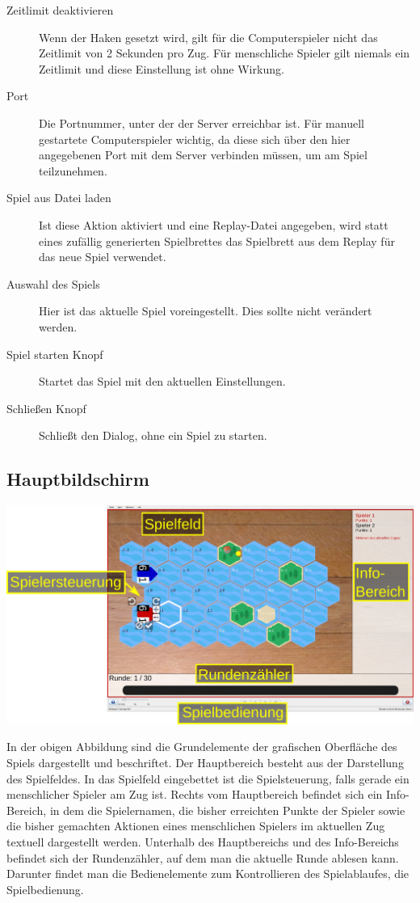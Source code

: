 \documentclass[12pt,a4paper, ngerman, oneside]{scrartcl}
\begin{document}
\begin{description}
\item [Zeitlimit deaktivieren] Wenn der Haken gesetzt wird, gilt für die Computerspieler nicht das Zeitlimit von 2 Sekunden pro Zug. Für menschliche Spieler gilt niemals ein Zeitlimit und diese Einstellung ist ohne Wirkung.
\item [Port] Die Portnummer, unter der der Server erreichbar ist. Für manuell gestartete Computerspieler wichtig, da diese sich über den hier angegebenen Port mit dem Server verbinden müssen, um am Spiel teilzunehmen.
\item [Spiel aus Datei laden] Ist diese Aktion aktiviert und eine Replay-Datei angegeben, wird statt eines zufällig generierten Spielbrettes das Spielbrett aus dem Replay für das neue Spiel verwendet.
\item [Auswahl des Spiels] Hier ist das aktuelle Spiel voreingestellt. Dies sollte nicht verändert werden.
\item [Spiel starten Knopf] Startet das Spiel mit den aktuellen Einstellungen.
\item [Schließen Knopf] Schließt den Dialog, ohne ein Spiel zu starten.
\end{description}

\subsection{Hauptbildschirm}

\begin{centering}
  \includegraphics[width=\textwidth]{bilder/gui-elemente.pdf}
\end{centering}

In der obigen Abbildung sind die Grundelemente der grafischen Oberfläche des
Spiels dargestellt und beschriftet. Der Hauptbereich besteht aus der Darstellung
des Spielfeldes. In das Spielfeld eingebettet ist die Spielsteuerung, falls
gerade ein menschlicher Spieler am Zug ist. Rechts vom Hauptbereich befindet
sich ein Info-Bereich, in dem die Spielernamen, die bisher erreichten Punkte der
Spieler sowie die bisher gemachten Aktionen eines menschlichen Spielers im
aktuellen Zug textuell dargestellt werden. Unterhalb des Hauptbereichs und des
Info-Bereichs befindet sich der Rundenzähler, auf dem man die aktuelle Runde
ablesen kann. Darunter findet man die Bedienelemente zum Kontrollieren des
Spielablaufes, die Spielbedienung.
\end{document}
